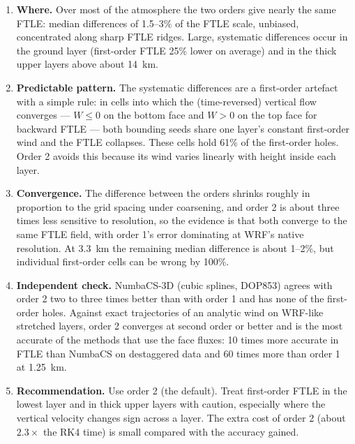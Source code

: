 \documentclass[11pt,a4paper]{article}
\begin{document}
\begin{enumerate}
  \item \textbf{Where.} Over most of the atmosphere the two orders give nearly
  the same FTLE: median differences of 1.5--3\% of the FTLE scale, unbiased,
  concentrated along sharp FTLE ridges. Large, systematic differences occur in
  the ground layer (first-order FTLE 25\% lower on average) and in the thick
  upper layers above about \SI{14}{km}.
  \item \textbf{Predictable pattern.} The systematic differences are a
  first-order artefact with a simple rule: in cells into which the
  (time-reversed) vertical flow converges --- $W\le0$ on the bottom face and
  $W>0$ on the top face for backward FTLE --- both bounding seeds share one
  layer's constant first-order wind and the FTLE collapses. These cells hold
  61\% of the first-order holes. Order 2 avoids this because its wind varies
  linearly with height inside each layer.
  \item \textbf{Convergence.} The difference between the orders shrinks
  roughly in proportion to the grid spacing under coarsening, and order 2 is
  about three times less sensitive to resolution, so the evidence is that both
  converge to the same FTLE field, with order 1's error dominating at WRF's
  native resolution. At \SI{3.3}{km} the remaining median difference is about
  1--2\%, but individual first-order cells can be wrong by 100\%.
  \item \textbf{Independent check.} NumbaCS-3D (cubic splines, DOP853) agrees
  with order 2 two to three times better than with order 1 and has none of
  the first-order holes. Against exact trajectories of an analytic wind on
  WRF-like stretched layers, order 2 converges at second order or better and is
  the most accurate of the methods that use the face fluxes: 10 times more
  accurate in FTLE than NumbaCS on destaggered data and 60 times more than
  order 1 at \SI{1.25}{km}.
  \item \textbf{Recommendation.} Use order 2 (the default). Treat first-order
  FTLE in the lowest layer and in thick upper layers with caution, especially
  where the vertical velocity changes sign across a layer. The extra cost of
  order 2 (about $2.3\times$ the RK4 time) is small compared with the
  accuracy gained.
\end{enumerate}

\appendix
\end{document}
